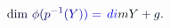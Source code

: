 \documentclass[12pt]{article}
\begin{document}
\makeatletter
\renewcommand*{\@textcolor}[3]{%
  \protect\leavevmode
  \begingroup
    \color#1{#2}#3%
  \endgroup
}
\makeatother
\begin{displaymath}
\mathrm { \mathcolor[RGB]{0,0,15}{d} \mathcolor[RGB]{0,0,30}{i} \mathcolor[RGB]{0,0,45}{m} } \mathcolor[RGB]{0,0,60}{\nobreakspace} \mathcolor[RGB]{0,0,75}{\phi} \mathcolor[RGB]{0,0,90}{(} \mathcolor[RGB]{0,0,105}{p} ^ { \mathcolor[RGB]{0,0,120}{-} \mathcolor[RGB]{0,0,135}{1} } \mathcolor[RGB]{0,0,150}{(} \mathcolor[RGB]{0,0,165}{Y} \mathcolor[RGB]{0,0,180}{)} \mathcolor[RGB]{0,0,195}{)} \mathcolor[RGB]{0,0,210}{=} \mathcolor[RGB]{0,0,225}{\operatorname*} { \mathcolor[RGB]{0,0,240}{d} \mathcolor[RGB]{0,0,255}{i} \mathcolor[RGB]{0,15,0}{m} } \mathcolor[RGB]{0,15,15}{Y} \mathcolor[RGB]{0,15,30}{+} \mathcolor[RGB]{0,15,45}{g} \mathcolor[RGB]{0,15,60}{.}
\end{displaymath}
\end{document}
